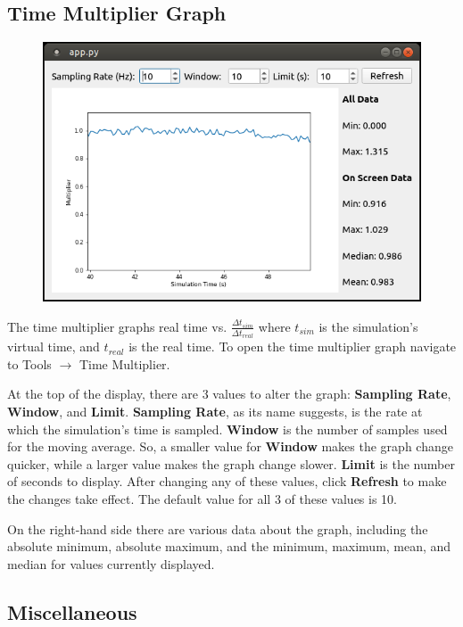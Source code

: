 \documentclass{article}
\begin{document}
\subsection{Time Multiplier Graph}
\begin{figure}[h]
    \centering
    \includegraphics[width=.6\textwidth]{images/TimeMult.PNG}
    \label{fig:timemult}
\end{figure}
The time multiplier graphs real time vs. $\frac{\Delta t_{sim}}{\Delta t_{real}}$ where $t_{sim}$ is the simulation's virtual time, and $t_{real}$ is the real time. To open the time multiplier graph navigate to Tools $\rightarrow$ Time Multiplier.\par
At the top of the display, there are 3 values to alter the graph: \textbf{Sampling Rate}, \textbf{Window}, and \textbf{Limit}. \textbf{Sampling Rate}, as its name suggests, is the rate at which the simulation's time is sampled. \textbf{Window} is the number of samples used for the moving average. So, a smaller value for \textbf{Window} makes the graph change quicker, while a larger value makes the graph change slower. \textbf{Limit} is the number of seconds to display. After changing any of these values, click \textbf{Refresh} to make the changes take effect. The default value for all 3 of these values is 10.\par
On the right-hand side there are various data about the graph, including the absolute minimum, absolute maximum, and the minimum, maximum, mean, and median for values currently displayed.
\subsection{Miscellaneous}
\end{document}
